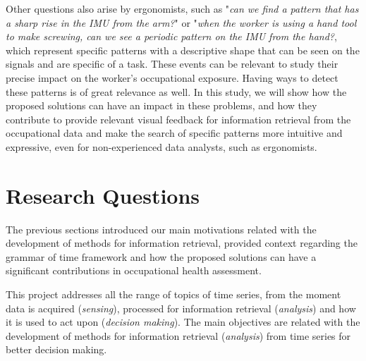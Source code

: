 Other questions also arise by ergonomists, such as "\textit{can we find a pattern that has a sharp rise in the IMU from the arm?}" or "\textit{when the worker is using a hand tool to make screwing, can we see a periodic pattern on the IMU from the hand?}, which represent specific patterns with a descriptive shape that can be seen on the signals and are specific of a task. These events can be relevant to study their precise impact on the worker's occupational exposure. Having ways to detect these patterns is of great relevance as well. In this study, we will show how the proposed solutions can have an impact in these problems, and how they contribute to provide relevant visual feedback for information retrieval from the occupational data and make the search of specific patterns more intuitive and expressive, even for non-experienced data analysts, such as ergonomists.


\section{Research Questions}

The previous sections introduced our main motivations related with the development of methods for information retrieval, provided context regarding the grammar of time framework and how the proposed solutions can have a significant contributions in occupational health assessment.
\par
This project addresses all the range of topics of time series, from the moment data is acquired (\textit{sensing}), processed for information retrieval (\textit{analysis}) and how it is used to act upon (\textit{decision making}). The main objectives are related with the development of methods for information retrieval (\textit{analysis}) from time series for better decision making.

